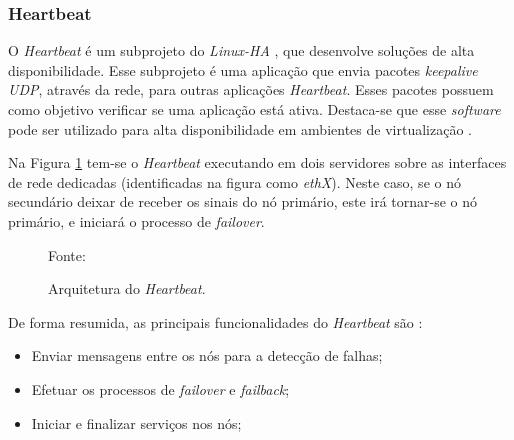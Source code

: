 
\subsubsection{Heartbeat}
\label{section:heartbeat}
O \textit{Heartbeat} é um subprojeto do \textit{Linux-HA} \cite{linuxha}, que desenvolve soluções de alta disponibilidade.
Esse subprojeto é uma aplicação que envia pacotes \textit{keepalive \ac{UDP}}, através da rede, para outras aplicações \textit{Heartbeat}. 
Esses pacotes possuem como objetivo verificar se uma aplicação está ativa.
Destaca-se que esse \textit{software} pode ser utilizado para alta disponibilidade em ambientes de virtualização \cite{reis2009}.

Na Figura \ref{fig:heartbeat} tem-se o \textit{Heartbeat} executando em dois servidores sobre as interfaces de rede dedicadas (identificadas na 
figura como \textit{ethX}).
Neste caso, se o nó secundário deixar de receber os sinais do nó primário, este irá tornar-se o nó primário, e iniciará o processo de 
\textit{failover}. 
\begin{figure}[h!]
 \centering
 \caption{Arquitetura do \textit{Heartbeat}.}
 Fonte: \citet{zaminhani2008}
 \label{fig:heartbeat}
\end{figure}

De forma resumida, as principais funcionalidades do \textit{Heartbeat} são \cite{clusterlabs}:
\begin{itemize}
 \item Enviar mensagens entre os nós para a detecção de falhas;
 \item Efetuar os processos de \textit{failover} e \textit{failback};
 \item Iniciar e finalizar serviços nos nós;
\end{itemize}

